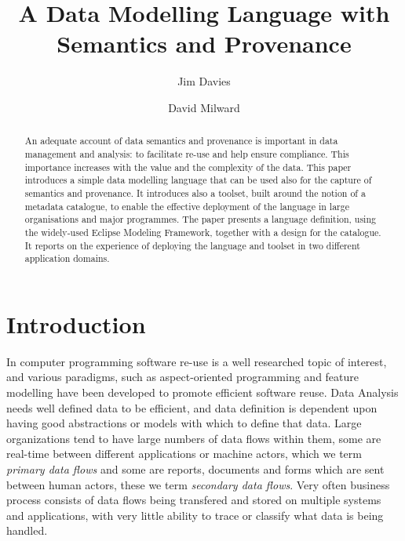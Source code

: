 \documentclass{llncs}
\begin{document}
	\frontmatter          %
	\pagestyle{headings}  %
	\title{A Data Modelling Language with Semantics and Provenance}
	
	\author{Jim Davies \and
		David Milward}
	
	
	
	\maketitle
	
	\begin{abstract}
		An adequate account of data semantics and provenance is important in data management and analysis: to facilitate re-use and help ensure compliance.  This importance increases with the value and the complexity of the data.  This paper introduces a simple data modelling language that can be used also for the capture of semantics and provenance.  It introduces also a toolset, built around the notion of a metadata catalogue, to enable the effective deployment of the language in large organisations and major programmes.  The paper presents a language definition, using the widely-used Eclipse Modeling Framework, together with a design for the catalogue.  It reports on the experience of deploying the language and toolset in two different application domains.
	\end{abstract}
	
	\section{Introduction}
	
	In computer programming software re-use is a well researched topic of interest, and various paradigms, such as aspect-oriented programming and feature modelling have been developed to promote efficient software reuse. Data Analysis needs well defined data to be efficient, and data definition is dependent upon having good abstractions or models with which to define that data. Large organizations tend to have large numbers of data flows within them, some are real-time between different applications or machine actors, which we term \emph{primary data flows} and some are reports, documents and forms which are sent between human actors, these we term \emph{secondary data flows}. Very often business process consists of data flows being transfered and stored on multiple systems and applications, with very little ability to trace or classify what data is being handled.
	
\end{document}
